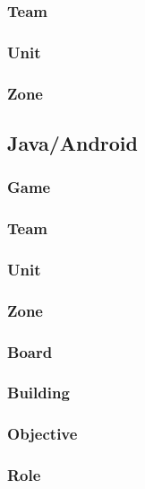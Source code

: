 			\subsubsection{Team}
			
			\subsubsection{Unit}
			
			\subsubsection{Zone}
		
		\subsection{Java/Android}
		
			\subsubsection{Game}
		
			\subsubsection{Team}
			
			\subsubsection{Unit}
			
			\subsubsection{Zone}
			
			\subsubsection{Board}
			
			\subsubsection{Building}
			
			\subsubsection{Objective}
			
			\subsubsection{Role}
			
